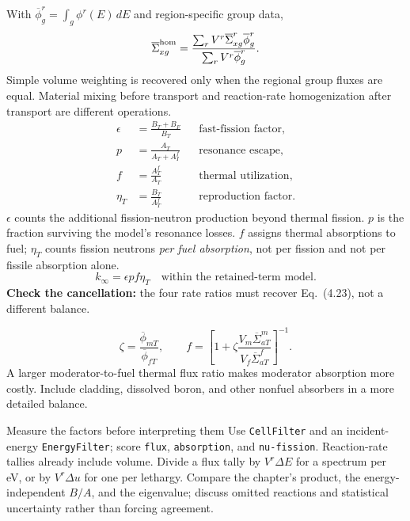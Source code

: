 \documentclass{ne630handout}
\begin{document}
With $\overline\phi_{g}^{r}=\int_g\phi^r(E)\,dE$ and region-specific group data,
\[
 \overline\Sigma_{xg}^{\rm hom}=
 \frac{\sum_r V^r\overline\Sigma_{xg}^r\overline\phi_{g}^{r}}
 {\sum_r V^r\overline\phi_{g}^{r}}.
\]
Simple volume weighting is recovered only when the regional group fluxes are equal. Material mixing before transport and reaction-rate homogenization after transport are different operations.
\colnext
{}
\begin{align*}
 \epsilon&=\frac{B_T+B_F}{B_T}
 &&\text{fast-fission factor},\\[2pt]
 p&=\frac{A_T}{A_T+A_I^f}
 &&\text{resonance escape},\\[2pt]
 f&=\frac{A_T^f}{A_T}
 &&\text{thermal utilization},\\[2pt]
 \eta_T&=\frac{B_T}{A_T^f}
 &&\text{reproduction factor}.
\end{align*}
$\epsilon$ counts the additional fission-neutron production beyond thermal fission. $p$ is the fraction surviving the model's resonance losses. $f$ assigns thermal absorptions to fuel; $\eta_T$ counts fission neutrons \emph{per fuel absorption}, not per fission and not per fissile absorption alone.
\[
 \boxed{k_\infty=\epsilon p f\eta_T}
 \quad\text{within the retained-term model.}
\]
\textbf{Check the cancellation:} the four rate ratios must recover Eq.\ (4.23), not a different balance.

\[
 \zeta=\frac{\overline\phi_{mT}}{\overline\phi_{fT}},\qquad
 f=\left[1+\zeta\frac{V_m\overline\Sigma_{aT}^{m}}
 {V_f\overline\Sigma_{aT}^{f}}\right]^{-1}.
\]
A larger moderator-to-fuel thermal flux ratio makes moderator absorption more costly. Include cladding, dissolved boron, and other nonfuel absorbers in a more detailed balance.

\colend
\begin{OpenMCExplore}{Measure the factors before interpreting them}
Use \texttt{CellFilter} and an incident-energy \texttt{EnergyFilter}; score \texttt{flux}, \texttt{absorption}, and \texttt{nu-fission}. Reaction-rate tallies already include volume. Divide a flux tally by $V^r\Delta E$ for a spectrum per eV, or by $V^r\Delta u$ for one per lethargy. Compare the chapter's product, the energy-independent $B/A$, and the eigenvalue; discuss omitted reactions and statistical uncertainty rather than forcing agreement.
\end{OpenMCExplore}
\end{document}
